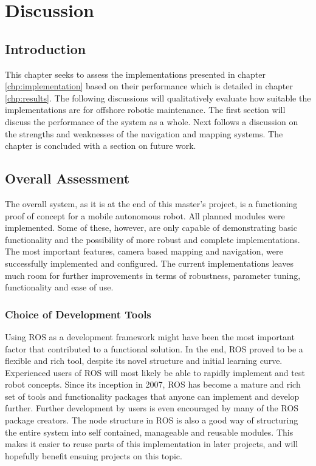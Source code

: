 \chapter{Discussion}
\label{chp:discussion} 

\section{Introduction}

This chapter seeks to assess the implementations presented in chapter \ref{chp:implementation} based on their performance which is detailed in chapter \ref{chp:results}. The following discussions will qualitatively evaluate how suitable the implementations are for offshore robotic maintenance. The first section will discuss the performance of the system as a whole. Next follows a discussion on the strengths and weaknesses of the navigation and mapping systems. The chapter is concluded with a section on future work. 

\section{Overall Assessment}

The overall system, as it is at the end of this master's project, is a functioning proof of concept for a mobile autonomous robot. All planned modules were implemented. Some of these, however, are only capable of demonstrating basic functionality and the possibility of more robust and complete implementations. The most important features, camera based mapping and navigation, were successfully implemented and configured. The current implementations leaves much room for further improvements in terms of robustness, parameter tuning, functionality and ease of use.

\subsection{Choice of Development Tools}

Using \ac{ROS} as a development framework might have been the most important factor that contributed to a functional solution. In the end, \ac{ROS} proved to be a flexible and rich tool, despite its novel structure and initial learning curve. Experienced users of \ac{ROS} will most likely be able to rapidly implement and test robot concepts.  Since its inception in 2007, \ac{ROS} has become a mature and rich set of tools and functionality packages that anyone can implement and develop further. Further development by users is even encouraged by many of the \ac{ROS} package creators. The node structure in \ac{ROS} is also a good way of structuring the entire system into self contained, manageable and reusable modules. This makes it easier to reuse parts of this implementation in later projects, and will hopefully benefit ensuing projects on this topic.

